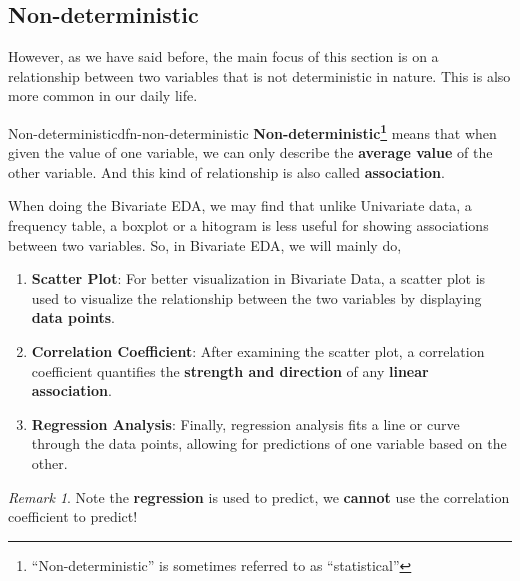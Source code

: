 \documentclass[math,code]{amznotes}
\theoremstyle{remark}
\newtheorem*{remark}{Remark}
\begin{document}
\subsection{Non-deterministic}
However, as we have said before, the main focus of this section is on a relationship between two variables that is not deterministic in nature. This is also more common in our daily life.
\begin{dfnbox}{Non-deterministic}{dfn-non-deterministic}
    {\color{red} \textbf{Non-deterministic\footnote{``Non-deterministic'' is sometimes referred to as ``statistical''}}} means that when given the value of one variable, we can only describe the \textbf{average value} of the other variable. And this kind of relationship is also called \textbf{association}.
\end{dfnbox}
When doing the Bivariate EDA, we may find that unlike Univariate data, a frequency table, a boxplot or a hitogram is less useful for showing associations between two variables. So, in Bivariate EDA, we will mainly do,
\begin{enumerate}
    \item \textbf{Scatter Plot}: For better visualization in Bivariate Data, a scatter plot is used to visualize the relationship between the two variables by displaying \textbf{data points}.
    \item \textbf{Correlation Coefficient}: After examining the scatter plot, a correlation coefficient quantifies the \textbf{strength and direction} of any \textbf{linear association}.
    \item \textbf{Regression Analysis}: Finally, regression analysis fits a line or curve through the data points, allowing for predictions of one variable based on the other.
\end{enumerate}
\begin{notebox}
    \begin{remark}
        Note the \textbf{regression} is used to predict, we \textbf{cannot} use the correlation coefficient to predict!
    \end{remark}
\end{notebox}
\end{document}
